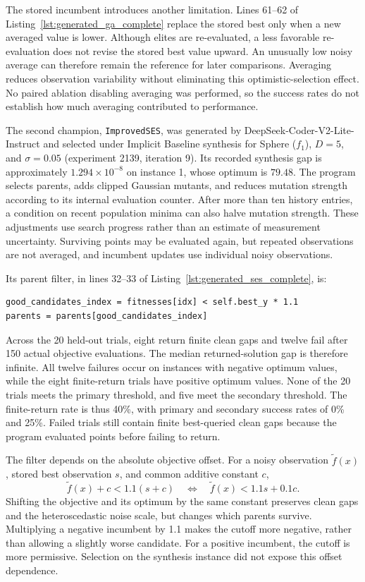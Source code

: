 The stored incumbent introduces another limitation. Lines 61--62
of Listing~\ref{lst:generated_ga_complete} replace the stored best
only when a new averaged value is lower. Although elites are
re-evaluated, a less favorable re-evaluation does not revise the
stored best value upward. An unusually low noisy average can
therefore remain the reference for later comparisons. Averaging
reduces observation variability without eliminating this
optimistic-selection effect. No paired ablation disabling averaging
was performed, so the success rates do not establish how much
averaging contributed to performance.

The second champion, \texttt{ImprovedSES}, was generated by
DeepSeek-Coder-V2-Lite-Instruct and selected under Implicit Baseline
synthesis for Sphere ($f_1$), $D=5$, and $\sigma=0.05$
(experiment 2139, iteration 9). Its recorded synthesis gap is
approximately $1.294\times10^{-8}$ on instance 1, whose optimum
is $79.48$. The program selects parents, adds clipped Gaussian
mutants, and reduces mutation strength according to its internal
evaluation counter. After more than ten history entries, a
condition on recent population minima can also halve mutation
strength. These adjustments use search progress rather than an
estimate of measurement uncertainty. Surviving points may be
evaluated again, but repeated observations are not averaged,
and incumbent updates use individual noisy observations.

Its parent filter, in lines 32--33 of
Listing~\ref{lst:generated_ses_complete}, is:
\begin{lstlisting}[style=championprogram,firstnumber=32,basicstyle=\ttfamily\footnotesize]
good_candidates_index = fitnesses[idx] < self.best_y * 1.1
parents = parents[good_candidates_index]
\end{lstlisting}
Across the 20 held-out trials, eight return finite clean gaps and
twelve fail after 150 actual objective evaluations. The median
returned-solution gap is therefore infinite. All twelve failures
occur on instances with negative optimum values, while the eight
finite-return trials have positive optimum values. None of the
20 trials meets the primary threshold, and five meet the secondary
threshold. The finite-return rate is thus 40\%, with primary and
secondary success rates of 0\% and 25\%. Failed trials still contain
finite best-queried clean gaps because the program evaluated
points before failing to return.

The filter depends on the absolute objective offset. For a noisy
observation $\widetilde f(x)$, stored best observation $s$, and
common additive constant $c$,
\begin{equation}
    \widetilde f(x)+c < 1.1(s+c)
    \quad\Longleftrightarrow\quad
    \widetilde f(x)<1.1s+0.1c.
    \label{eq:ses_offset_sensitivity}
\end{equation}
Shifting the objective and its optimum by the same constant
preserves clean gaps and the heteroscedastic noise scale, but
changes which parents survive. Multiplying a negative incumbent
by 1.1 makes the cutoff more negative, rather than allowing a
slightly worse candidate. For a positive incumbent, the cutoff
is more permissive. Selection on the synthesis instance did not
expose this offset dependence.


